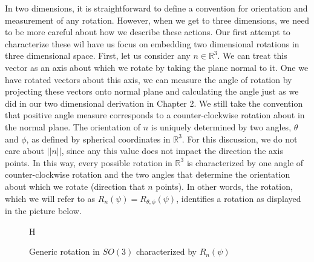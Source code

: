 \documentclass[10pt]{ucthesis}
\newcommand{\R}{\mathbb{R}}
\begin{document}
In two dimensions, it is straightforward to define a convention for orientation and measurement of any rotation. However, when we get to three dimensions, we need to be more careful about how we describe these actions. Our first attempt to characterize these wil have us focus on embedding two dimensional rotations in three dimensional space. First, let us consider any $n\in\R^3$. We can treat this vector as an axis about which we rotate by taking the plane normal to it. One we have rotated vectors about this axis, we can measure the angle of rotation by projecting these vectors onto normal plane and calculating the angle just as we did in our two dimensional derivation in Chapter 2. We still take the convention that positive angle measure corresponds to a counter-clockwise rotation about in the normal plane. The orientation of $n$ is uniquely determined by two angles, $\theta$ and $\phi$, as defined by spherical coordinates in $\R^3$. For this discussion, we do not care about $||n||$, since any this value does not impact the direction the axis points. In this way, every possible rotation in $\R^3$ is characterized by one angle of counter-clockwise rotation and the two angles that determine the orientation about which we rotate (direction that $n$ points). In other words, the rotation, which we will refer to as $R_n(\psi) = R_{\theta,\phi}(\psi)$, identifies a rotation as displayed in the picture below.


\begin{figure}{H}
	\centering
	\centering
	\caption{Generic rotation in $SO(3)$ characterized by $R_n(\psi)$}		
\end{figure}
\end{document}
